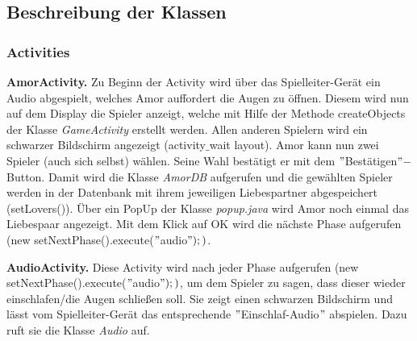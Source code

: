 \documentclass[12pt, a4paper]{article}
\begin{document}
		
	\subsection{Beschreibung der Klassen}
		
		\subsubsection{Activities}
		
\textbf{AmorActivity.}
Zu Beginn der Activity wird über das Spielleiter-Gerät ein Audio abgespielt, welches Amor auffordert die Augen zu öffnen. Diesem wird nun auf dem Display die Spieler anzeigt, welche mit Hilfe der Methode createObjects der Klasse \textit{GameActivity} erstellt werden. Allen anderen Spielern wird ein schwarzer Bildschirm angezeigt (activity$\_$wait layout). Amor kann nun zwei Spieler (auch sich selbst) wählen. Seine Wahl bestätigt er mit dem $"$Bestätigen$" -$ Button. Damit wird die Klasse \textit{AmorDB} aufgerufen und die gewählten Spieler werden in der Datenbank mit ihrem jeweiligen Liebespartner abgespeichert (setLovers()).
Über ein PopUp der Klasse \textit{popup.java} wird Amor noch einmal das Liebespaar angezeigt. Mit dem Klick auf OK wird die nächste Phase aufgerufen (new setNextPhase().execute($"$audio$");)$.

\vspace{0,3 cm}
      
\textbf{AudioActivity.}
Diese Activity wird nach jeder Phase aufgerufen (new setNextPhase().execute($"$audio$");)$, um dem Spieler zu sagen, dass dieser wieder einschlafen/die Augen schließen soll. Sie zeigt einen schwarzen Bildschirm und lässt vom Spielleiter-Gerät das entsprechende $"$Einschlaf-Audio$"$ abspielen. Dazu ruft sie die Klasse \textit{Audio} auf.

\vspace{0,3 cm}
\end{document}
